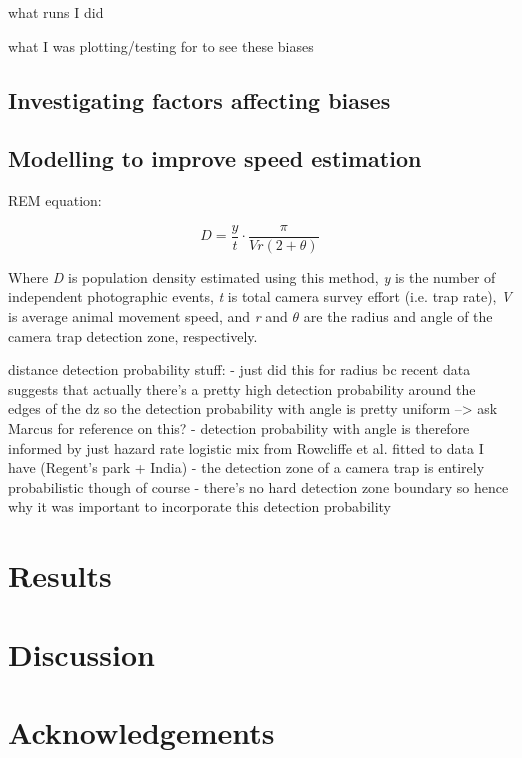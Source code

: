 \documentclass[11pt]{article}
\begin{document}
	what runs I did
	
	what I was plotting/testing for to see these biases
	
	
	
	
	\subsection{Investigating factors affecting biases}
	
	
	
	
	\subsection{Modelling to improve speed estimation}
	

	
	
	REM equation:
	
		\begin{equation}
			D = \frac{y}{t} \cdot \frac{\pi}{Vr(2 + \theta)}
	\end{equation}
	
	Where \textit{D} is population density estimated using this method, \textit{y} is the number of independent photographic events, \textit{t} is total camera survey effort (i.e. trap rate), \textit{V} is average animal movement speed, and \textit{r} and \begin{math}\theta\end{math} are the radius and angle of the camera trap detection zone, respectively. 
	
	
	distance detection probability stuff:
	- just did this for radius bc recent data suggests that actually there's a pretty high detection probability around the edges of the dz so the detection probability with angle is pretty uniform --> ask Marcus for reference on this?
	- detection probability with angle is therefore informed by just hazard rate logistic mix from Rowcliffe et al. fitted to data I have (Regent's park + India)
	- the detection zone of a camera trap is entirely probabilistic though of course - there's no hard detection zone boundary so hence why it was important to incorporate this detection probability
	
	
	
	
	\section{Results}
	
	
	
	\newpage
	
	\section{Discussion}
	
	
	

	\section{Acknowledgements}

	
	
	
\end{document}
